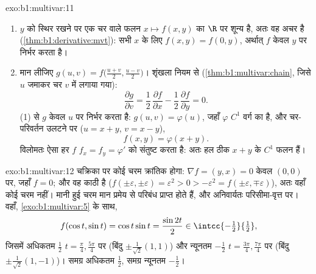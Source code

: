 \begin{solution}{exo:b1:multivar:11}
\begin{enumerate}
  \item $y$ को स्थिर रखने पर एक चर वाले फलन $x \mapsto f(x,y)$ का
         $\R$ पर शून्य है, अतः वह अचर है
        (\cref{thm:b1:derivative:mvt}): सभी $x$ के लिए $f(x, y) = f(0,
        y)$, अर्थात् $f$ केवल $y$ पर निर्भर करता है।
  \item मान लीजिए $g(u, v) = f\bigl(\frac{u+v}2, \frac{u-v}2\bigr)$।
        शृंखला नियम से (\cref{thm:b1:multivar:chain}, जिसे $u$ जमाकर
        चर $v$ में लगाया गया):
        \[
        \frac{\partial g}{\partial v}
        = \frac12\,\frac{\partial f}{\partial x}
        - \frac12\,\frac{\partial f}{\partial y} = 0 .
        \]
        (1) से $g$ केवल $u$ पर निर्भर करता है: $g(u, v) = \varphi(u)$,
        जहाँ $\varphi$ $C^1$ वर्ग का है, और चर-परिवर्तन उलटने पर ($u =
        x + y$, $v = x - y$),
        \[
        f(x, y) = \varphi(x + y).
        \]
        विलोमतः ऐसा हर $f$ $f_x = f_y = \varphi'$ को संतुष्ट करता है:
        अतः हल ठीक $x + y$ के $C^1$ फलन हैं।
\end{enumerate}
\end{solution}

\begin{solution}{exo:b1:multivar:12}
 चक्रिका पर कोई चरम क्रांतिक होगा: $\nabla f = (y, x) = 0$ केवल
$(0,0)$ पर, जहाँ $f = 0$; और वह काठी है ($f(\pm \varepsilon,
\pm\varepsilon) = \varepsilon^2 > 0 > -\varepsilon^2 = f(\pm\varepsilon,
\mp\varepsilon)$), अतः वहाँ कोई चरम नहीं। मानी हुई चरम मान प्रमेय से
परिबंध प्राप्त होते हैं, और अनिवार्यतः परिसीमा-वृत्त पर। वहाँ,
\cref{exo:b1:multivar:5} के साथ,
\[
f(\cos t, \sin t) = \cos t\sin t = \frac{\sin 2t}{2}
\in \intcc{-\tfrac12}{\tfrac12},
\]
जिसमें अधिकतम $\frac12$ $t = \frac\pi4, \frac{5\pi}4$ पर (बिंदु
$\pm\frac{1}{\sqrt2}(1,1)$) और न्यूनतम $-\frac12$ $t = \frac{3\pi}4,
\frac{7\pi}4$ पर (बिंदु $\pm\frac{1}{\sqrt2}(1,-1)$)। समग्र अधिकतम
$\frac12$, समग्र न्यूनतम $-\frac12$।
\end{solution}

